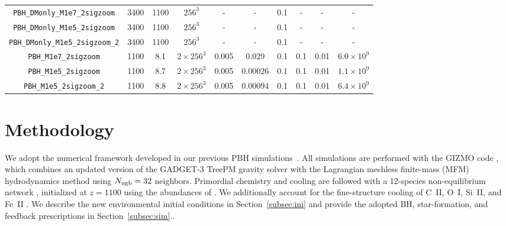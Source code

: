 \documentclass[twocolumn,trackchanges]{aastex701}
\begin{document}
\begin{table}[htb!]
\begin{tabular}{cccccccccc}
        \hline
    
    \texttt{PBH\_DMonly\_M1e7\_2sigzoom}   & 3400  & 1100 & $ 256^3$  & -& - & 0.1  & - & -  & - \\
    \texttt{PBH\_DMonly\_M1e5\_2sigzoom}   & 3400  & 1100 & $ 256^3$  & -& - & 0.1   & - & -  & - \\
    \texttt{PBH\_DMonly\_M1e5\_2sigzoom\_2}   & 3400  & 1100 & $ 256^3$  & -& - & 0.1   & - & -  & - \\
    \texttt{PBH\_M1e7\_2sigzoom}   & 1100 & 8.1 &  $2\times 256^3$  &  0.005 & 0.029 & 0.1 & 0.1 & 0.01 & $6.0\times 10^{9}$ \\
    \texttt{PBH\_M1e5\_2sigzoom}   & 1100 & 8.7 &  $2\times 256^3$  &  0.005 & $0.00026$ & 0.1 & 0.1 & 0.01 & $1.1\times 10^{9}$ \\
    \texttt{PBH\_M1e5\_2sigzoom\_2}   & 1100 & 8.8 &  $2\times 256^3$  &  0.005 & $0.00094$ & 0.1 & 0.1 & 0.01 & $6.4\times 10^{9}$ \\


    \hline


    \hline
    \end{tabular}
    \label{Table:SimParam}
\end{table}


\section{Methodology} \label{sec:meth}

We adopt the numerical framework developed in our previous PBH simulations~\citep{ZhangPBHGalaxy2025ApJ,ZhangDCBHPBH2025ApJ,Zhang2026PBHApJL}. All simulations are performed with the \textsc{GIZMO} code \citep{Hopkins2015MNRAS.450...53H}, which combines an updated version of the \textsc{GADGET-3} TreePM gravity solver \citep{springel2005cosmological} with the Lagrangian meshless finite-mass (MFM) hydrodynamics method using $N_{\rm ngb}=32$ neighbors. Primordial chemistry and cooling are followed with a 12-species
non-equilibrium network \citep{Bromm2002ApJ...564...23B,
Johnson2006MNRAS.366..247J}, initialized at $z=1100$ using the abundances of
\citet{Galli2013ARA&A..51..163G}. We additionally account for the fine-structure cooling of C~\textsc{II}, O~\textsc{I}, Si~\textsc{II}, and Fe~\textsc{II} \citep{Safranek2010,Jaacks2018}. We describe the new environmental initial conditions in Section~\ref{subsec:ini} and provide the adopted BH, star-formation, and feedback prescriptions in Section~\ref{subsec:sim}..
\end{document}
